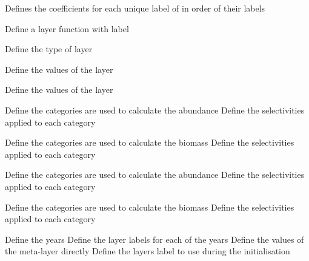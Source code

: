  {Defines the coefficients for each unique label of  in order of their labels}
\par{} {Define a layer function with label}\par
{} {Define the type of layer}
\par\textbf{}\par
{} {Define the values of the layer}
\par\textbf{}\par
{} {Define the values of the layer}
\par\textbf{}\par
\par\textbf{}\par
{} {Define the categories are used to calculate the abundance}
 {Define the selectivities applied to each category}
\par\textbf{}\par
{} {Define the categories are used to calculate the biomass}
 {Define the selectivities applied to each category}
\par\textbf{}\par
{} {Define the categories are used to calculate the abundance}
 {Define the selectivities applied to each category}
\par\textbf{}\par
{} {Define the categories are used to calculate the biomass}
 {Define the selectivities applied to each category}
\par\textbf{}\par
{} {Define the years}
 {Define the layer labels for each of the years}
 {Define the values of the meta-layer directly}
 {Define the layers label to use during the initialisation}
